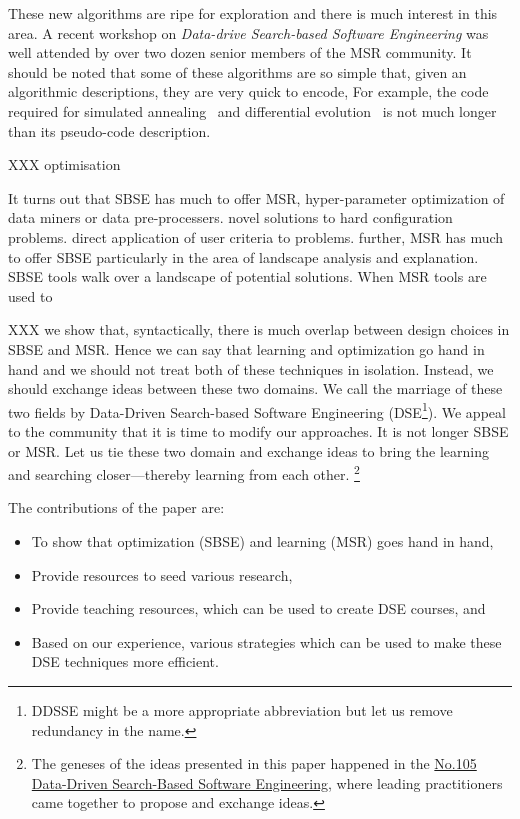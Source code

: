 \documentclass[table, xcdraw, sigconf,review, anonymous]{acmart}
\begin{document}
These new algorithms are ripe for exploration and there is much interest in this area.
A recent workshop  on {\em Data-drive Search-based Software
Engineering } was well attended by over two dozen senior members of the MSR community.
It should be noted that some of these algorithms are so simple that, 
given an algorithmic descriptions, they are very quick to encode,
For example, the code required for simulated annealing~\cite{van1987simulated} and
differential evolution~\cite{storn97} is not much longer than its pseudo-code description. 

XXX optimisation

It turns out that SBSE has much to offer MSR, hyper-parameter optimization of data miners or data pre-processers. novel solutions to hard configuration problems. direct application of user criteria to problems. further, MSR has much to offer SBSE particularly in the area of landscape analysis and explanation. SBSE tools walk over a landscape of potential solutions. When MSR tools are used to 

XXX we show that,  syntactically, there is much overlap between design choices in SBSE and MSR. Hence we can say that learning and optimization go hand in hand and we should not treat both of these techniques in isolation. Instead, we should exchange ideas between these two domains. We call the marriage of these two fields by Data-Driven Search-based Software Engineering (DSE\footnote{DDSSE might be a more appropriate abbreviation but let us remove redundancy in the name.}). We appeal to the community that it is time to modify our approaches. It is not longer SBSE or MSR. Let us tie these two domain and exchange ideas to bring the learning and searching closer---thereby learning from each other. \footnote{The geneses of the ideas presented in this paper happened in the \href{http://shonan.nii.ac.jp/shonan/blog/2016/09/08/data-driven-search-based-software-engineering/}{No.105 Data-Driven Search-Based Software Engineering}, where leading practitioners came together to propose and exchange ideas.}  

The contributions of the paper are:
\begin{itemize}
    \item To show that optimization (SBSE) and learning (MSR) goes hand in hand,
    \item Provide resources to seed various research,
    \item Provide teaching resources, which can be used to create DSE courses, and
    \item Based on our experience, various strategies which can be used to make these DSE techniques more efficient.
\end{itemize}
\end{document}
